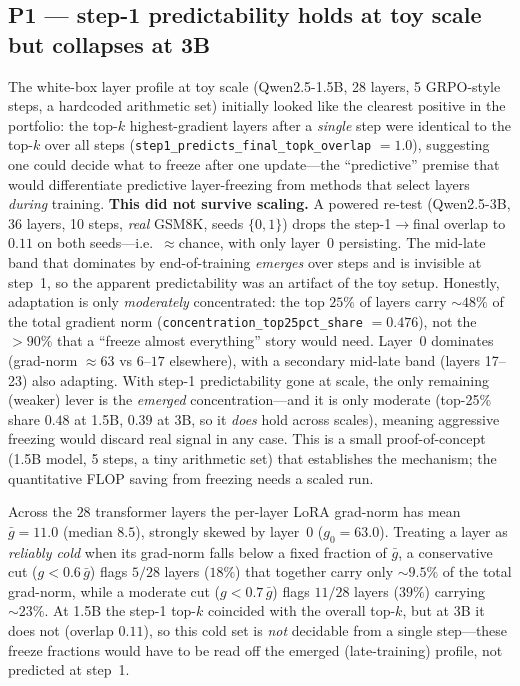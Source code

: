 \documentclass[11pt,a4paper]{article}
\begin{document}
\subsection{P1 --- step-1 predictability holds at toy scale but collapses at 3B}

The white-box layer profile at toy scale (Qwen2.5-1.5B, 28 layers, 5 GRPO-style
steps, a hardcoded arithmetic set) initially looked like the clearest positive in
the portfolio: the top-$k$ highest-gradient layers after a \emph{single} step were
identical to the top-$k$ over all steps (\texttt{step1\_predicts\_final\_topk\_overlap}
$=1.0$), suggesting one could decide what to freeze after one update---the
``predictive'' premise that would differentiate predictive layer-freezing from
methods that select layers \emph{during} training. \textbf{This did not survive
scaling.} A powered re-test (Qwen2.5-3B, 36 layers, 10 steps, \emph{real} GSM8K,
seeds $\{0,1\}$) drops the step-1$\to$final overlap to $0.11$ on both seeds---i.e.\
${\approx}$chance, with only layer~0 persisting. The mid-late band that dominates by
end-of-training \emph{emerges} over steps and is invisible at step~1, so the apparent
predictability was an artifact of the toy setup. Honestly, adaptation is only
\emph{moderately} concentrated: the top $25\%$ of layers carry ${\sim}48\%$ of the
total gradient norm (\texttt{concentration\_top25pct\_share} $=0.476$), not the
$>90\%$ that a ``freeze almost everything'' story would need. Layer~0 dominates
(grad-norm $\approx 63$ vs $6$--$17$ elsewhere), with a secondary mid-late band
(layers 17--23) also adapting. With step-1 predictability gone at scale, the only remaining (weaker) lever is the
\emph{emerged} concentration---and it is only moderate (top-25\% share $0.48$ at 1.5B,
$0.39$ at 3B, so it \emph{does} hold across scales), meaning aggressive freezing would
discard real signal in any case. This is a small proof-of-concept
(1.5B model, 5 steps, a tiny arithmetic set) that establishes the mechanism; the
quantitative FLOP saving from freezing needs a scaled run.

Across the $28$ transformer layers the per-layer LoRA grad-norm has mean
$\bar{g}=11.0$ (median $8.5$), strongly skewed by layer~0 ($g_0=63.0$). Treating a
layer as \emph{reliably cold} when its grad-norm falls below a fixed fraction of
$\bar{g}$, a conservative cut ($g<0.6\,\bar{g}$) flags $5/28$ layers ($18\%$) that
together carry only $\sim\!9.5\%$ of the total grad-norm, while a moderate cut
($g<0.7\,\bar{g}$) flags $11/28$ layers ($39\%$) carrying $\sim\!23\%$. At 1.5B the step-1 top-$k$ coincided with the overall top-$k$, but at 3B it does
not (overlap $0.11$), so this cold set is \emph{not} decidable from a single step---these
freeze fractions would have to be read off the emerged (late-training) profile, not
predicted at step~1.
\end{document}
